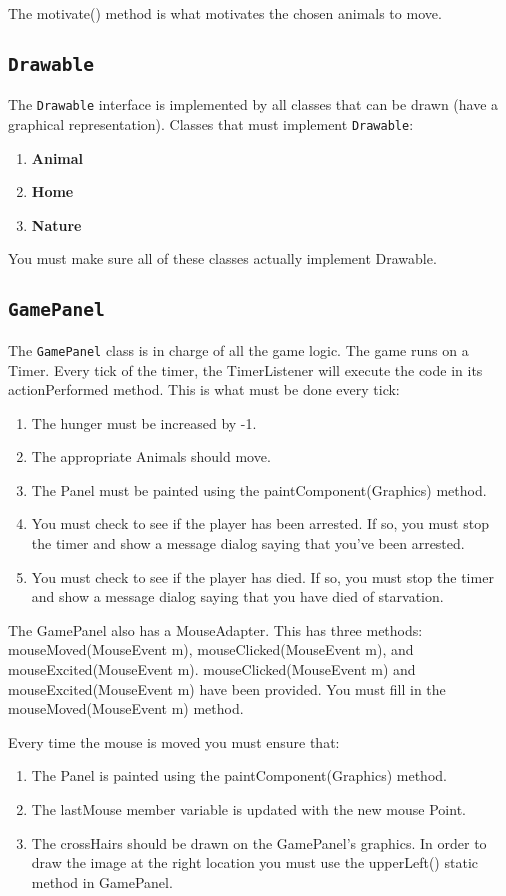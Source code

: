 \documentclass[12pt]{article}
\begin{document}
The motivate() method is what motivates the chosen animals to move.

\subsection{{\tt Drawable}}

The {\tt Drawable} interface is implemented by all classes that can be drawn (have a graphical representation).
Classes that must implement {\tt Drawable}:
\begin{enumerate}
    \item {\bf {Animal}}
    \item {\bf {Home}}
    \item {\bf {Nature}}
    \end{enumerate}
You must make sure all of these classes actually implement Drawable.


\subsection{{\tt GamePanel}}
The {\tt GamePanel} class is in charge of all the game logic.  The game runs on a Timer.  Every tick of the timer, the TimerListener will execute the code in its actionPerformed method.  This is what must be done every tick:
\begin{enumerate}
    \item The hunger must be increased by -1.
    \item The appropriate Animals should move.
    \item The Panel must be painted using the paintComponent(Graphics) method.
    \item You must  check to see if the player has been arrested.  If so, you must stop the timer and show a message dialog saying that you've been arrested.
    \item You must check to see if the player has died.  If so, you must stop the timer and show a message dialog saying that you have died of starvation.
    \end{enumerate}

The GamePanel also has a MouseAdapter.  This has three methods: mouseMoved(MouseEvent m), mouseClicked(MouseEvent m), and mouseExcited(MouseEvent m).
mouseClicked(MouseEvent m) and mouseExcited(MouseEvent m) have been provided. You must fill in the mouseMoved(MouseEvent m) method.

Every time the mouse is moved you must ensure that:
\begin{enumerate}
    \item The Panel is painted using the paintComponent(Graphics) method.
    \item The lastMouse member variable is updated with the new mouse Point.
    \item The crossHairs should be drawn on the GamePanel's graphics.  In order to draw the image at the right location you must use the upperLeft() static method in GamePanel.
    \end{enumerate}
\end{document}
